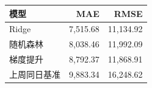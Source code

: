 \begin{tabular}{lrr}
\toprule
模型 & MAE & RMSE \\
\midrule
Ridge & 7,515.68 & 11,134.92 \\
随机森林 & 8,038.46 & 11,992.09 \\
梯度提升 & 8,792.37 & 11,868.91 \\
上周同日基准 & 9,883.34 & 16,248.62 \\
\bottomrule
\end{tabular}
